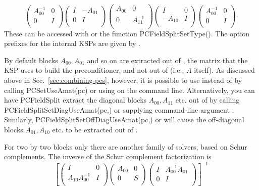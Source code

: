 \[
\left( \begin{array}{cc}
A_{00}^{-1}   & 0 \\
0 & I \\
\end{array} \right)
\left( \begin{array}{cc}
I   & -A_{01} \\
0 & I \\
\end{array} \right)
\left( \begin{array}{cc}
A_{00}   & 0 \\
0 & A_{11}^{-1} \\
\end{array} \right)
\left( \begin{array}{cc}
I   & 0 \\
-A_{10} & I \\
\end{array} \right)
\left( \begin{array}{cc}
A_{00}^{-1}   & 0 \\
0 & I \\
\end{array} \right).
\]
These can be accessed with   or the function PCFieldSplitSetType(). The option prefixes for the internal KSPs are given by .

By default blocks $A_{00}, A_{01}$ and so on are extracted out of , the matrix that the KSP uses to build the preconditioner,
and not out of  (i.e., $A$ itself). As discussed above in Sec.~\ref{sec:combining-pcs}, however, it is possible to use 
instead of  by calling PCSetUseAmat(pc) or using  on the command line.  Alternatively, you can have PCFieldSplit
extract the diagonal blocks $A_{00}, A_{11}$ etc. out of  by calling PCFieldSplitSetDiagUseAmat(pc,) or supplying
command-line argument .  Similarly, PCFieldSplitSetOffDiagUseAmat(pc,) or 
will cause the off-diagonal blocks $A_{01},A_{10}$ etc. to be extracted out of .

For two by two blocks only there are another family of solvers, based on Schur complements. The inverse of the Schur complement factorization is
\[
\left[
\left( \begin{array}{cc}
I   & 0 \\
A_{10}A_{00}^{-1} & I \\
\end{array} \right)
\left( \begin{array}{cc}
A_{00}  & 0 \\
0 & S \\
\end{array} \right)
\left( \begin{array}{cc}
I   & A_{00}^{-1} A_{01} \\
0 & I \\
\end{array} \right)
\right]^{-1}
\]


